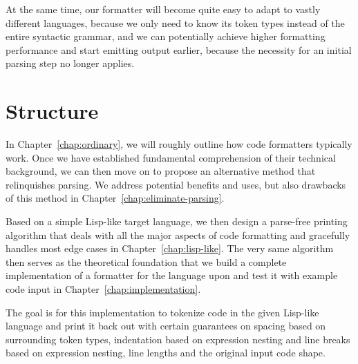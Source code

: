 At the same time, our formatter will become quite easy to adapt to vastly different languages,
because we only need to know its token types instead of the entire syntactic grammar,
and we can potentially achieve higher formatting performance and start emitting output earlier,
because the necessity for an initial parsing step no longer applies.

\section{Structure}
In Chapter~\ref{chap:ordinary}, we will roughly outline how code formatters typically work.
Once we have established fundamental comprehension of their technical background,
we can then move on to propose an alternative method that relinquishes parsing.
We address potential benefits and uses,
but also drawbacks of this method in Chapter~\ref{chap:eliminate-parsing}.

Based on a simple Lisp-like target language,
we then design a parse-free printing algorithm
that deals with all the major aspects of code formatting
and gracefully handles most edge cases
in Chapter~\ref{chap:lisp-like}.
The very same algorithm then serves as the theoretical foundation
that we build a complete implementation of a formatter
for the language upon and test it with example code input
in Chapter~\ref{chap:implementation}.

The goal is for this implementation to tokenize code in the given Lisp-like language
and print it back out with certain guarantees on
spacing based on surrounding token types,
indentation based on expression nesting and
line breaks based on expression nesting, line lengths and the original input code shape.
